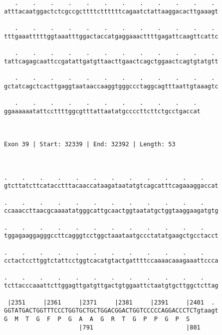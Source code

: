 \documentclass{article}
\begin{document}
\begin{Verbatim}
   .    .    .    .    .    .    .    .    .    .    .    . 
atttacaatggactctcgccgcttttcttttttcagaatctattaaggacacttgaaagt
                                                            
   .    .    .    .    .    .    .    .    .    .    .    . 
tttgaaatttttggtaaatttggactaccatgaggaaacttttgagattcaagttcattc
                                                            
   .    .    .    .    .    .    .    .    .    .    .    . 
tattcagagcaattccgatattgatgttaacttgaactcagctggaactcagtgtatgtt
                                                            
   .    .    .    .    .    .    .    .    .    .    .    . 
gctatcagctcacttgaggtaataaccaaggtgggccctaggcagtttaattgtaaagtc
                                                            
   .    .    .    .    .    .    .    .    .    .    . 
ggaaaaaatattccttttggcgtttattaatatgccccttcttctgcctgaccat
                                                       
                                                       
 
Exon 39 | Start: 32339 | End: 32392 | Length: 53



.    .    .    .    .    .    .    .    .    .    .    .    
gtcttatcttcatacctttacaaccataagataatatgtcagcatttcagaaaggaccat
                                                            
.    .    .    .    .    .    .    .    .    .    .    .    
ccaaaccttaacgcaaaatatgggcattgcaactggtaatatgctggtaaggaagatgtg
                                                            
.    .    .    .    .    .    .    .    .    .    .    .    
tggagaaggagggccttcagggtcctggctaaataatgccctatatgaagctgcctacct
                                                            
.    .    .    .    .    .    .    .    .    .    .    .    
cctactccttggtctattcctggtcacatgtactgattttccaaaacaaagaaattccca
                                                            
.    .    .    .    .    .    .    .    .    .    .    .    
tcttacccaaattcttggagttgatgttgactgtggaattctaatgtgcttggctcttag
                                                            
 |2351     |2361     |2371     |2381     |2391     |2401  . 
GGTATGACTGGTTTCCCTGGTGCTGCTGGACGGACTGGTCCCCCAGGACCCTCTgtaagt
G  M  T  G  F  P  G  A  A  G  R  T  G  P  P  G  P  S        
                     |791                          |801     
  

\end{Verbatim}
\end{document}

